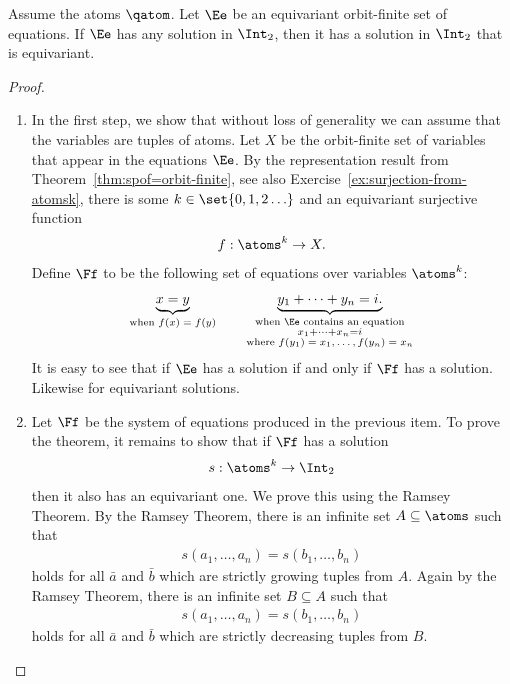 \begin{theorem}\label{thm:equivariant-solutions-to-systems-of-equations}
 Assume the atoms $\qatom$. 
 Let $\Ee$ be an equivariant orbit-finite set of equations. If $\Ee$ has any solution in $\Int_2$, then it has a solution in $\Int_2$ that is equivariant. 
\end{theorem}
\begin{proof}\ 
 \begin{enumerate}
 \item In the first step, we show that without loss of generality we can assume that the variables are tuples of atoms. Let $X$ be the orbit-finite set of variables that appear in the equations $\Ee$. By the representation result from Theorem~\ref{thm:spof=orbit-finite}, see also Exercise~\ref{ex:surjection-from-atomsk}, there is some $k \in \set{0,1,2\ldots}$ and an equivariant surjective function 
 \begin{align*}
 f : \atoms^k \to X.
 \end{align*}
 Define $\Ff$ to be the following set of equations over variables $\atoms^k$:
 \begin{align*}
 \underbrace{x=y}_{\text{when $f(x)=f(y)$}} \qquad \underbrace{ y_1 + \cdots + y_n = i.}_{\substack{\text{when $\Ee$ contains an equation}\\ x_1 + \cdots + x_n = i \\ \text{where $f(y_1)=x_1,\ldots,f(y_n)=x_n$}}}
 \end{align*}
 It is easy to see that if $\Ee$ has a solution if and only if $\Ff$ has a solution. Likewise for equivariant solutions. 
 \item Let $\Ff$ be the system of equations produced in the previous item. To prove the theorem, it remains to show that if $\Ff$ has a solution
 \begin{align*}
 s : \atoms^k \to \Int_2
 \end{align*}
 then it also has an equivariant one. We prove this using the Ramsey Theorem. By the Ramsey Theorem, there is an infinite set $A \subseteq \mathbb \atoms$ such that 
\begin{align*}
 s(a_1,\ldots,a_n) = s(b_1,\ldots,b_n) 
\end{align*}
holds for all $\bar a$ and $\bar b$ which are strictly growing tuples from $A$. 
Again by the Ramsey Theorem, there is an infinite set $B \subseteq A$ such that \begin{align*}
 s(a_1,\ldots,a_n) = s(b_1,\ldots,b_n) 
\end{align*}
holds for all $\bar a$ and $\bar b$ which are strictly decreasing tuples from $B$. 

\end{enumerate}
\end{proof}
